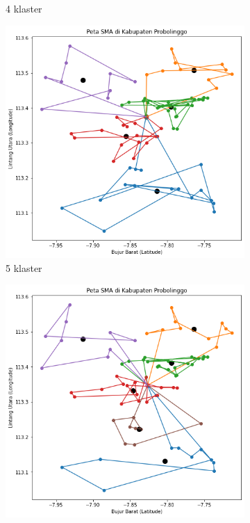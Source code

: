 \begin{frame}
\begin{figure}
\begin{subfigure}[h]{0.2\textwidth}
		\caption{4 klaster}
		\end{subfigure}
		\hfill
		\begin{subfigure}[h]{0.2\textwidth}
		\includegraphics[width=\textwidth]{gambar/hasil_mtsp/5}
		\caption{5 klaster}
		\end{subfigure}
		\hfill
		\begin{subfigure}[h]{0.2\textwidth}
		\includegraphics[width=\textwidth]{gambar/hasil_mtsp/6}

\end{subfigure}
\end{figure}
\end{frame}
